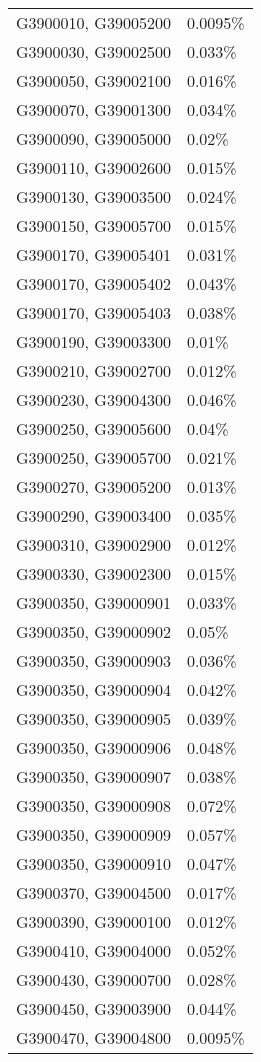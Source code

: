 \begin{longtable}[]{@{}ll@{}}
G3900010, G39005200 & 0.0095\% \\
G3900030, G39002500 & 0.033\% \\
G3900050, G39002100 & 0.016\% \\
G3900070, G39001300 & 0.034\% \\
G3900090, G39005000 & 0.02\% \\
G3900110, G39002600 & 0.015\% \\
G3900130, G39003500 & 0.024\% \\
G3900150, G39005700 & 0.015\% \\
G3900170, G39005401 & 0.031\% \\
G3900170, G39005402 & 0.043\% \\
G3900170, G39005403 & 0.038\% \\
G3900190, G39003300 & 0.01\% \\
G3900210, G39002700 & 0.012\% \\
G3900230, G39004300 & 0.046\% \\
G3900250, G39005600 & 0.04\% \\
G3900250, G39005700 & 0.021\% \\
G3900270, G39005200 & 0.013\% \\
G3900290, G39003400 & 0.035\% \\
G3900310, G39002900 & 0.012\% \\
G3900330, G39002300 & 0.015\% \\
G3900350, G39000901 & 0.033\% \\
G3900350, G39000902 & 0.05\% \\
G3900350, G39000903 & 0.036\% \\
G3900350, G39000904 & 0.042\% \\
G3900350, G39000905 & 0.039\% \\
G3900350, G39000906 & 0.048\% \\
G3900350, G39000907 & 0.038\% \\
G3900350, G39000908 & 0.072\% \\
G3900350, G39000909 & 0.057\% \\
G3900350, G39000910 & 0.047\% \\
G3900370, G39004500 & 0.017\% \\
G3900390, G39000100 & 0.012\% \\
G3900410, G39004000 & 0.052\% \\
G3900430, G39000700 & 0.028\% \\
G3900450, G39003900 & 0.044\% \\
G3900470, G39004800 & 0.0095\% \\

\end{longtable}
